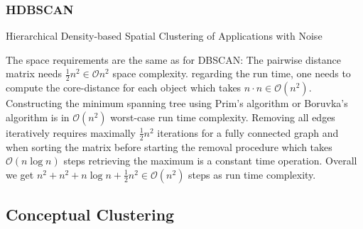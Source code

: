 \subsubsection{HDBSCAN}\label{\positionnumber}
\begin{algorithm}[htp]
    \hrulealg
\caption{Hierarchical Density-based Spatial Clustering of Applications with Noise}\label{hdbscan}
\end{algorithm}
The space requirements are the same as for DBSCAN: The pairwise distance matrix needs $\frac{1}{2}n^2 \in \mathcal{O}n^2$ space complexity. regarding the run time, one needs to compute the core-distance for each object which takes $n \cdot n \in \mathcal{O}(n^2)$. Constructing the minimum spanning tree using Prim's algorithm or Boruvka's algorithm is in $\mathcal{O}(n^2)$ worst-case run time complexity. Removing all edges iteratively requires maximally $\frac{1}{2}n^2$ iterations for a fully connected graph and when sorting the matrix before starting the removal procedure which takes $\mathcal{O}(n \log n)$ steps retrieving the maximum is a constant time operation. Overall we get $n^2 + n^2 + n \log n +\frac{1}{2}n^2 \in \mathcal{O}(n^2)$ steps as run time complexity.

\subsection{Conceptual Clustering}\label{\positionnumber}
